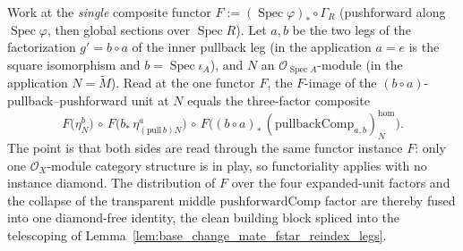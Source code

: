 \begin{lemma}

  \label{lem:base_change_mate_fstar_reindex_legs_link_distributeCollapse}
  Work at the \emph{single} composite functor
  \(F := (\operatorname{Spec}\varphi)_{*} \circ \Gamma_R\) (pushforward along
  \(\operatorname{Spec}\varphi\), then global sections over \(\operatorname{Spec} R\)). Let \(a, b\) be
  the two legs of the factorization \(g' = b \circ a\) of the inner pullback leg (in the application
  \(a = e\) is the square isomorphism and \(b = \operatorname{Spec}\iota_A\)), and \(N\) an
  \(\mathcal{O}_{\operatorname{Spec} A}\)-module (in the application \(N = \widetilde M\)). Read at the
  one functor \(F\), the \(F\)-image of the \((b \circ a)\)-pullback--pushforward unit at \(N\) equals
  the three-factor composite
  \[
    F\bigl(\eta^{b}_{N}\bigr)
    \,\circ\,
    F\bigl(b_{*}\,\eta^{a}_{(\mathrm{pull}\,b)N}\bigr)
    \,\circ\,
    F\bigl((b \circ a)_{*}\,(\mathrm{pullbackComp}_{a,b})^{\mathrm{hom}}_{N}\bigr).
  \]
  The point is that both sides are read through the same functor instance \(F\): only one
  \(\mathcal{O}_X\)-module category structure is in play, so functoriality applies with no instance
  diamond. The distribution of \(F\) over the four expanded-unit factors and the collapse of the
  transparent middle \(\mathrm{pushforwardComp}\) factor are thereby fused into one diamond-free
  identity, the clean building block spliced into the telescoping of
  Lemma~\ref{lem:base_change_mate_fstar_reindex_legs}.
\end{lemma}
